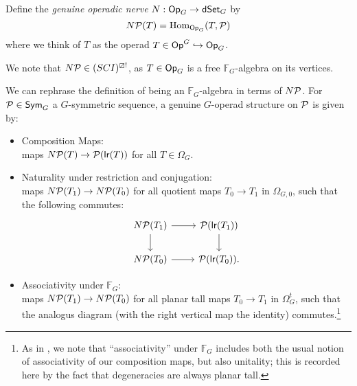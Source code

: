 \documentclass[a4paper,10pt
,draft
]{article}%
\renewcommand{\1}{\eta}%
\begin{document}
\begin{definition}
      Define the \textit{genuine operadic nerve} $N: \Op_G \to \dSet_G$ by
      \begin{equation}
            N\P(T) = \Hom_{\Op_G}(T, \P)
      \end{equation}
      where we think of $T$ as the operad $T \in \Op^G \into \Op_G$. 
\end{definition}

\begin{remark}
      We note that $N\P \in (SCI)^{\boxslash !}$,
      as $T \in \Op_G$ is a free $\mathbb F_G$-algebra on its vertices.
\end{remark}

\begin{remark}
      We can rephrase the definition of being an $\mathbb F_G$-algebra in terms of $N\P$.
      For $\P \in \Sym_G$ a $G$-symmetric sequence,
      a genuine $G$-operad structure on $\P$ is given by:
      \begin{itemize}
      \item Composition Maps: $ $\\
            maps 
            $N\P(T) \to \P(\mathsf{lr}(T))$
            for all $T \in \Omega_G$.
      \item Naturality under restriction and conjugation: $ $\\
            maps $N\P(T_1) \to N\P(T_0)$
            for all quotient maps $T_0 \to T_1$ in $\Omega_{G,0}$,
            such that the following commutes:
            \begin{equation}
                  \begin{tikzcd}
                        N\P(T_1) \arrow[r] \arrow[d]
                        &
                        \P(\mathsf{lr}(T_1)) \arrow[d]
                        \\
                        N\P(T_0) \arrow[r]
                        &
                        \P(\mathsf{lr}(T_0)).
                  \end{tikzcd}
            \end{equation}
      \item Associativity under $\mathbb F_G$: $ $\\
            maps $N\P(T_1) \to N\P(T_0)$
            for all planar tall maps $T_0 \to T_1$ in $\Omega_G^t$,
            such that the analogus diagram (with the right vertical map the identity) commutes.\footnote{
              As in \cite{BP_geo}, we note that ``associativity'' under $\mathbb F_G$ includes both
              the usual notion of associativity of our composition maps,
              but also unitality;
              this is recorded here by the fact that degeneracies are always planar tall.}
      \end{itemize}
\end{remark}
\end{document}
